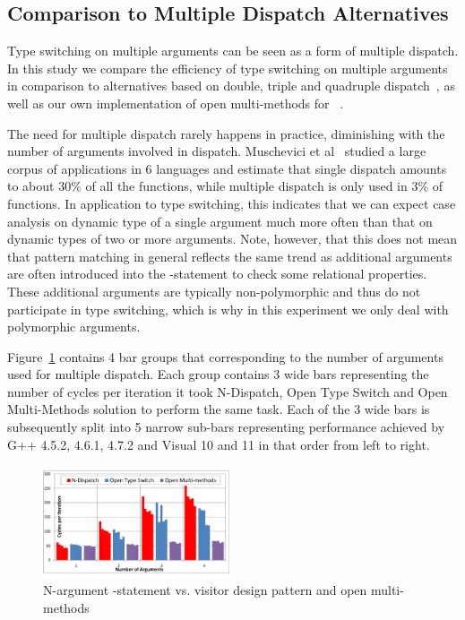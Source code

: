 \subsection{Comparison to Multiple Dispatch Alternatives}
\label{sec:dd}

Type switching on multiple arguments can be seen as a form of multiple dispatch. 
In this study we compare the efficiency of type switching on multiple arguments 
in comparison to alternatives based on double, triple and quadruple dispatch~\cite{Ingalls86}, 
as well as our own implementation of open multi-methods for \Cpp{}~\cite{OpenMM}.

The need for multiple dispatch rarely happens in practice, diminishing with the 
number of arguments involved in dispatch. Muschevici et al~\cite{MPTN08} studied 
a large corpus of applications in 6 languages and estimate that single dispatch 
amounts to about 30\% of all the functions, while multiple dispatch is only used 
in 3\% of functions. In application to type switching, this indicates that we 
can expect case analysis on dynamic type of a single argument much more often 
than that on dynamic types of two or more arguments. Note, however, that this 
does not mean that pattern matching in general reflects the same trend as 
additional arguments are often introduced into the -statement to 
check some relational properties. These additional arguments are typically 
non-polymorphic and thus do not participate in type switching, which is why in 
this experiment we only deal with polymorphic arguments.


Figure~\ref{fig:dispatch} contains 4 bar groups that corresponding to the number 
of arguments used for multiple dispatch. Each group contains 3 wide bars 
representing the number of cycles per iteration it took N-Dispatch, Open Type 
Switch and Open Multi-Methods solution to perform the same task. Each of the 3 
wide bars is subsequently split into 5 narrow sub-bars representing performance 
achieved by G++ 4.5.2, 4.6.1, 4.7.2 and Visual \Cpp{} 10 and 11 in that order from 
left to right.

\begin{figure}[htbp]
  \centering
    \includegraphics[width=0.49\textwidth]{Timing-N-arg.pdf}
  \caption{N-argument -statement vs. visitor design pattern and open multi-methods}
  \label{fig:dispatch}
\end{figure}

